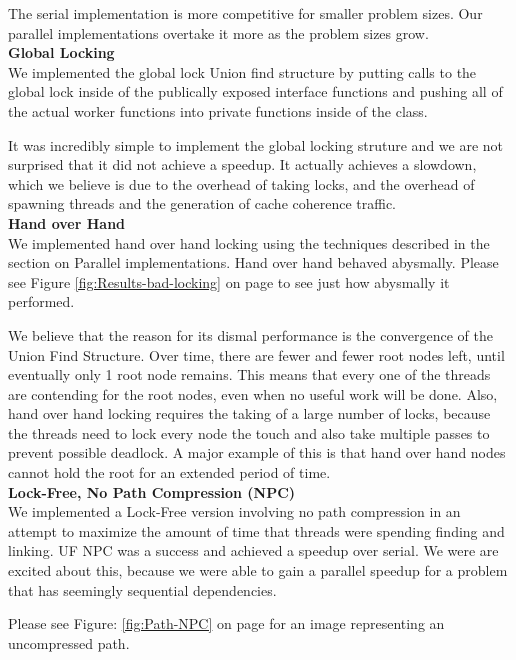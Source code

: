 \documentclass[11pt]{article}
\begin{document}
The serial implementation is more competitive for smaller problem sizes. Our parallel implementations overtake it more as the problem sizes grow.\\


\textbf{Global Locking}\\
We implemented the global lock Union find structure by putting calls to the global lock inside of the publically exposed interface functions and pushing all of the actual worker functions into private functions inside of the class.

It was incredibly simple to implement the global locking struture and we are not surprised that it did not achieve a speedup. It actually achieves a slowdown, which we believe is due to the overhead of taking locks, and the overhead of spawning threads and the generation of cache coherence traffic.\\


\textbf{Hand over Hand}\\
We implemented hand over hand locking using the techniques described in the section on Parallel implementations. Hand over hand behaved abysmally. Please see Figure \ref{fig:Results-bad-locking} on page \pageref{fig:Results-bad-locking} to see just how abysmally it performed.

We believe that the reason for its dismal performance is the convergence of the Union Find Structure. Over time, there are fewer and fewer root nodes left, until eventually only 1 root node remains. This means that every one of the threads are contending for the root nodes, even when no useful work will be done. Also, hand over hand locking requires the taking of a large number of locks, because the threads need to lock every node the touch and also take multiple passes to prevent possible deadlock. A major example of this is that hand over hand nodes cannot hold the root for an extended period of time.\\


\textbf{Lock-Free, No Path Compression (NPC)}\\
We implemented a Lock-Free version involving no path compression in an attempt to maximize the amount of time that threads were spending finding and linking. UF NPC was a success and achieved a speedup over serial. We were are excited about this, because we were able to gain a parallel speedup for a problem that has seemingly sequential dependencies.

Please see Figure: \ref{fig:Path-NPC} on page \pageref{fig:Path-NPC} for an image representing an uncompressed path.\\
\end{document}
